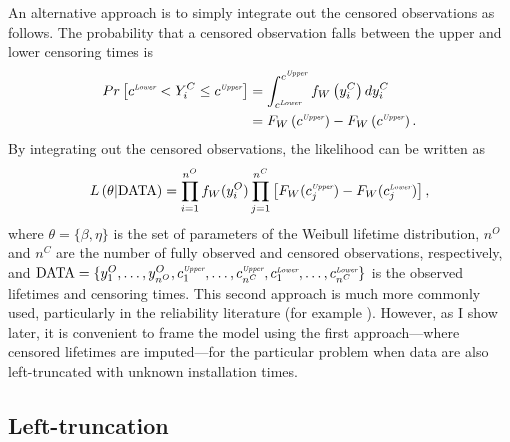 An alternative approach is to simply integrate out the censored observations as follows. The probability that a censored observation falls between the upper and lower censoring times is
\begin{align*}
    \label{eq:integrate-out-cens}
    Pr\left[c^{\textit{\tiny{Lower}}} < Y^C_i \leq c^{\textit{\tiny{Upper}}}\right] & = \int_{c^{\textit{\tiny{Lower}}}}^{c^{\textit{\tiny{Upper}}}} f_W\left(y^C_i\right) d y^C_i \\
    & = F_W\left(c^{\textit{\tiny{Upper}}}\right) - F_W\left(c^{\textit{\tiny{Upper}}}\right).
\end{align*}
By integrating out the censored observations, the likelihood can be written as
\begin{equation}
    \label{eq:censored_likelihood}
    L\left(\theta|\text{DATA}\right) = \prod^{n^O}_{i = 1}f_W(y^O_i)
    \prod^{n^C}_{j = 1}\left[F_W(c^{\textit{\tiny{Upper}}}_j) - F_W(c^{\textit{\tiny{Lower}}}_j)\right],
\end{equation}
where $\theta = \{\beta, \eta\}$ is the set of parameters of the Weibull lifetime distribution, $n^O$ and $n^C$ are the number of fully observed and censored observations, respectively, and $\text{DATA} = \{y^O_1, 
\dots, y^O_{n^O}, c^{\textit{\tiny{Upper}}}_1, \dots, c^{\textit{\tiny{Upper}}}_{n^C}, c^{\textit{\tiny{Lower}}}_1, \dots, c^{\textit{\tiny{Lower}}}_{n^C}\}$ is the observed lifetimes and censoring times. This second approach is much more commonly used, particularly in the reliability literature (for example \citet{Meeker2022,tian2024,hong2009,mittman2013}). However, as I show later, it is convenient to frame the model using the first approach---where censored lifetimes are imputed---for the particular problem when data are also left-truncated with unknown installation times.

\subsection{Left-truncation}

